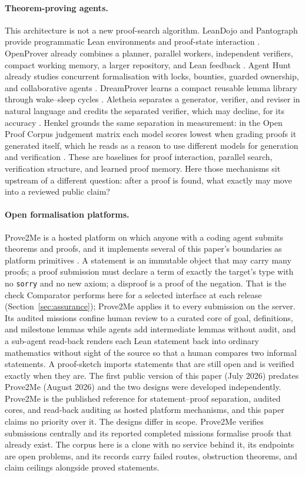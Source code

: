 \documentclass[10pt]{article}
\begin{document}
\paragraph{Theorem-proving agents.}
This architecture is not a new proof-search algorithm. LeanDojo and Pantograph
provide programmatic Lean environments and proof-state interaction
\cite{leandojo,pantograph}. OpenProver already combines a planner, parallel
workers, independent verifiers, compact working memory, a larger repository,
and Lean feedback \cite{openprover}. Agent Hunt already studies concurrent
formalisation with locks, bounties, guarded ownership, and collaborative
agents \cite{agenthunt}. DreamProver learns a compact reusable lemma library
through wake--sleep cycles \cite{dreamprover}. Aletheia separates a
generator, verifier, and reviser in natural language and credits the
separated verifier, which may decline, for its accuracy
\cite{autonomousmath}. Henkel grounds the same separation in measurement:
in the Open Proof Corpus judgement matrix each model scores lowest when
grading proofs it generated itself, which he reads as a reason to use
different models for generation and verification
\cite{henkel,openproofcorpus}. These are baselines for proof interaction,
parallel search, verification structure, and learned proof memory. Here those mechanisms
sit upstream of a different question: after a proof is found, what exactly may
move into a reviewed public claim?

\paragraph{Open formalisation platforms.}
Prove2Me is a hosted platform on which anyone with a coding agent submits
theorems and proofs, and it implements several of this paper's boundaries as
platform primitives \cite{prove2me}. A statement is an immutable object that
may carry many proofs; a proof submission must declare a term of exactly the
target's type with no \texttt{sorry} and no new axiom; a disproof is a proof
of the negation. That is the check Comparator performs here for a selected
interface at each release (Section~\ref{sec:assurance}); Prove2Me applies it
to every submission on the server. Its audited missions confine human review
to a curated core of goal, definitions, and milestone lemmas while agents add
intermediate lemmas without audit, and a sub-agent read-back renders each
Lean statement back into ordinary mathematics without sight of the source so
that a human compares two informal statements. A proof-sketch imports
statements that are still open and is verified exactly when they are. The
first public version of this paper (July 2026) predates Prove2Me (August
2026) and the two designs were developed independently. Prove2Me is the
published reference for statement--proof separation, audited cores, and
read-back auditing as hosted platform mechanisms, and this paper claims no
priority over it. The designs differ in scope. Prove2Me verifies submissions
centrally and its reported completed missions formalise proofs that already
exist. The corpus here is a clone with no service behind it, its endpoints are
open problems, and its records carry failed routes, obstruction theorems, and
claim ceilings alongside proved statements.
\end{document}
